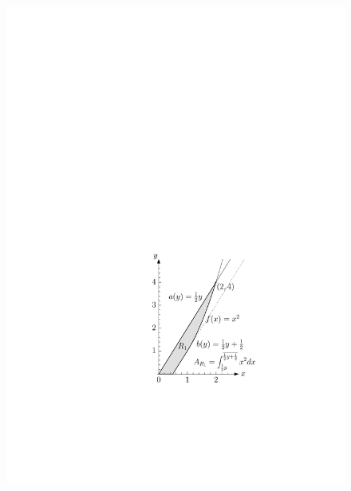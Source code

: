 \documentclass{article}
\theoremstyle{theorem}
\theoremstyle{definition}
\begin{document}
\begin{figure}
\centering
\begin{minipage}{.5\textwidth}
  \centering
  \includegraphics[width=0.9\linewidth]{fig20b.pdf}
\end{minipage}%
\begin{minipage}{.5\textwidth}
  \centering

\end{minipage}
\end{figure}
\end{document}

